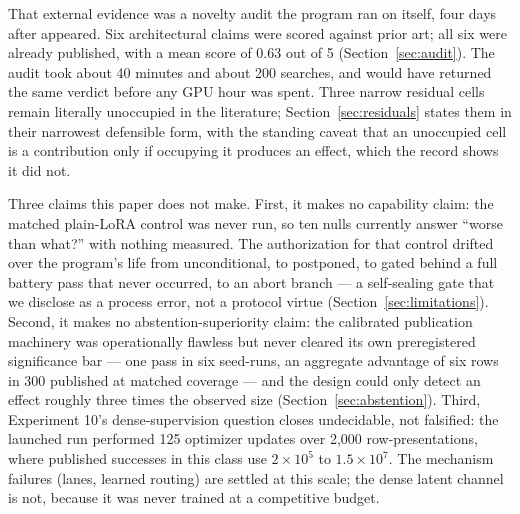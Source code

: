 \documentclass[10pt,a4paper]{article}
\begin{document}
That external evidence was a novelty audit the program ran on itself, four
days after \cite{xun2026lagged} appeared. Six architectural claims were
scored against prior art; all six were already published, with a mean score
of 0.63 out of 5 (Section~\ref{sec:audit}). The audit took about 40 minutes
and about 200 searches, and would have returned the same verdict before any
GPU hour was spent. Three narrow residual cells remain literally unoccupied
in the literature; Section~\ref{sec:residuals} states them in their narrowest
defensible form, with the standing caveat that an unoccupied cell is a
contribution only if occupying it produces an effect, which the record shows
it did not.

Three claims this paper does not make. First, it makes no capability claim:
the matched plain-LoRA control was never run, so ten nulls currently answer
``worse than what?'' with nothing measured. The authorization for that
control drifted over the program's life from unconditional, to postponed, to
gated behind a full battery pass that never occurred, to an abort branch --- a
self-sealing gate that we disclose as a process error, not a protocol virtue
(Section~\ref{sec:limitations}). Second, it makes no abstention-superiority
claim: the calibrated publication machinery was operationally flawless but
never cleared its own preregistered significance bar --- one pass in six
seed-runs, an aggregate advantage of six rows in 300 published at matched
coverage --- and the design could only detect an effect roughly three times
the observed size (Section~\ref{sec:abstention}). Third, Experiment 10's
dense-supervision question closes undecidable, not falsified: the launched
run performed 125 optimizer updates over 2{,}000 row-presentations, where
published successes in this class use $2\times10^{5}$ to $1.5\times10^{7}$.
The mechanism failures (lanes, learned routing) are settled at this scale;
the dense latent channel is not, because it was never trained at a
competitive budget.
\end{document}
